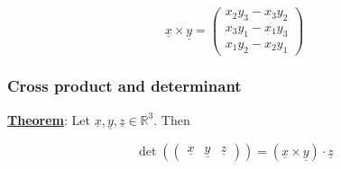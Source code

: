 \documentclass[10pt]{extarticle}
\newcommand{\R}{\mathbb{R}}
\begin{document}
$$
    \underline{x} \times \underline{y} = \begin{pmatrix}
        x_2 y_3 - x_3 y_2 \\
        x_3 y_1 - x_1 y_3 \\
        x_1 y_2 - x_2 y_1
    \end{pmatrix}
$$

\subsubsection{Cross product and determinant}

\textbf{\underline{Theorem}}: Let $\underline{x}, \underline{y}, \underline{z} \in \R^3$. Then

$$
    \det \left( \begin{pmatrix}
            \underline{x} & \underline{y} & \underline{z}
        \end{pmatrix} \right) = (\underline{x} \times \underline{y}) \cdot \underline{z}
$$
\end{document}
